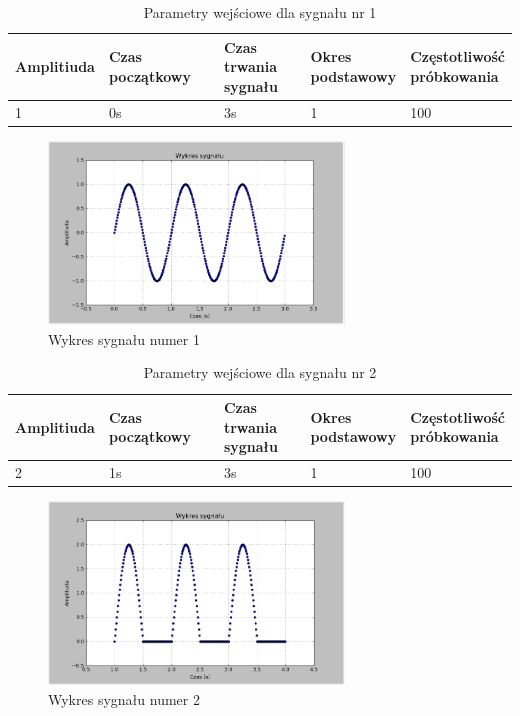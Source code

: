 \documentclass{article}
\begin{document}
{{    \begin{table}[h!]
        \centering
        \begin{tabular}{|l|l|l|l|l|}
            \hline
            Amplitiuda & Czas początkowy & \shortstack{Czas trwania \\ sygnału} & \shortstack{Okres \\ podstawowy} & \shortstack{Częstotliwość\\ próbkowania}   \\ \hline
            1 & 0s & 3s & 1 & 100           \\ \hline
        \end{tabular}
        \caption{Parametry wejściowe dla sygnału nr 1}
    \end{table}
    \begin{figure}[h!]
        \centering
        \includegraphics[width=0.7\textwidth]{img/splot1.png}
        \caption{Wykres sygnału numer 1}
    \end{figure}
    \FloatBarrier
    \begin{table}[h!]
        \centering
        \begin{tabular}{|l|l|l|l|l|}
            \hline
            Amplitiuda & Czas początkowy & \shortstack{Czas trwania \\ sygnału} & \shortstack{Okres \\ podstawowy} & \shortstack{Częstotliwość\\ próbkowania}   \\ \hline
            2 & 1s & 3s & 1 & 100           \\ \hline
        \end{tabular}
        \caption{Parametry wejściowe dla sygnału nr 2}
    \end{table}
    \begin{figure}[h!]
        \centering
        \includegraphics[width=0.7\textwidth]{img/splot4.png}
        \caption{Wykres sygnału numer 2}
    \end{figure}

}}
\end{document}
